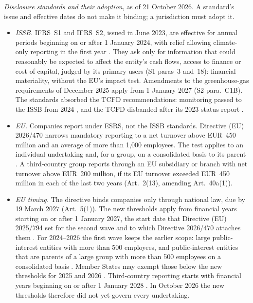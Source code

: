 \begin{qfmethod}
\emph{Disclosure standards and their adoption}, as of 21 October 2026. A standard's issue and effective dates do not make it binding; a jurisdiction must adopt it.
\begin{itemize}
\item \emph{ISSB.} IFRS~S1 and IFRS~S2, issued in June 2023, are effective for annual periods beginning on or after 1 January 2024, with relief allowing climate-only reporting in the first year \citep[S1 paras~E1 and~E5; S2 para.~C1]{ifrs-s1-s2-2026}. They ask only for information that could reasonably be expected to affect the entity's cash flows, access to finance or cost of capital, judged by its primary users (S1 paras~3 and~18): financial materiality, without the EU's impact test. Amendments to the greenhouse-gas requirements of December 2025 apply from 1 January 2027 (S2 para.~C1B). The standards absorbed the TCFD recommendations: monitoring passed to the ISSB from 2024 \citep[ref.~21/2023]{fsb-climate-roadmap-2023}, and the TCFD disbanded after its 2023 status report \citep[p.~3]{tcfd-status-2023}.
\item \emph{EU.} Companies report under ESRS, not the ISSB standards. Directive (EU) 2026/470 narrows mandatory reporting to a net turnover above EUR~450 million and an average of more than 1{,}000 employees. The test applies to an individual undertaking and, for a group, on a consolidated basis to its parent \citep[Art.~2(4) and~(5), amending Arts~19a(1) and~29a(1) of Directive 2013/34/EU]{eu-2026-470-sustainability-omnibus}. A third-country group reports through an EU subsidiary or branch with net turnover above EUR~200 million, if its EU turnover exceeded EUR~450 million in each of the last two years (Art.~2(13), amending Art.~40a(1)).
\item \emph{EU timing.} The directive binds companies only through national law, due by 19 March 2027 (Art.~5(1)). The new thresholds apply from financial years starting on or after 1 January 2027, the start date that Directive (EU) 2025/794 set for the second wave \citep[Art.~1]{eu-2025-794-stop-the-clock} and to which Directive 2026/470 attaches them \citep[Art.~3(1)]{eu-2026-470-sustainability-omnibus}. For 2024--2026 the first wave keeps the earlier scope: large public-interest entities with more than 500 employees, and public-interest entities that are parents of a large group with more than 500 employees on a consolidated basis \citep[Art.~5(2)(a)(i)--(ii)]{eu-2022-2464-csrd}. Member States may exempt those below the new thresholds for 2025 and 2026 \citep[Art.~3(1)]{eu-2026-470-sustainability-omnibus}. Third-country reporting starts with financial years beginning on or after 1 January 2028 \citep[Art.~5(2)]{eu-2022-2464-csrd}. In October 2026 the new thresholds therefore did not yet govern every undertaking.

\end{itemize}
\end{qfmethod}
